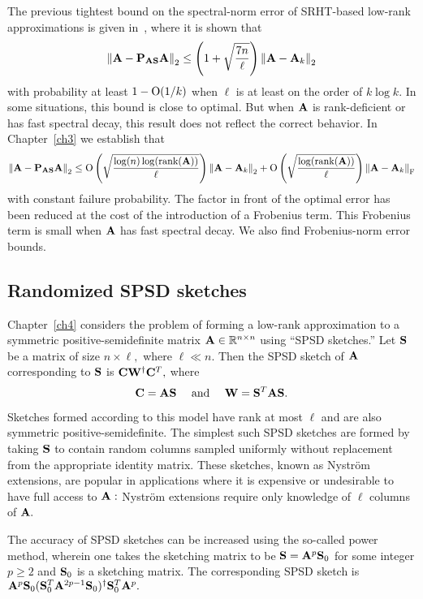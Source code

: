 The previous tightest bound on the spectral-norm error of SRHT-based low-rank
approximations is given in~\cite{HMT11}, where it is shown that 
\[
 \left\|\mathbf{A} - \mathbf{P}_{\mathbf{A}\mathbf{S}}\mathbf{A}\right\|_2 \leq 
 \left(1 + \sqrt{\frac{7n}{\ell}}\right) \left\|\mathbf{A} - \mathbf{A}_k\right\|_2
\]
with probability at least $1 - \mathrm{O}(1/k)$ when $\ell$ is at least on 
the order of $k \log k.$ In some situations, this bound is close to optimal. 
But when $\mathbf{A}$ is rank-deficient or has fast spectral decay, this result 
does not reflect the correct behavior. In Chapter~\ref{ch3} we establish that
\[
 \left\|\mathbf{A} - \mathbf{P}_{\mathbf{A}\mathbf{S}}\mathbf{A}\right\|_2 \leq 
 \mathrm{O}\left(\sqrt{\frac{\log(n)\log(\text{rank}(\mathbf{A}))}{\ell}}\right) 
 \left\|\mathbf{A} - \mathbf{A}_k\right\|_2 + \mathrm{O}\left(\sqrt{\frac{\log(\text{rank}(\mathbf{A}))}{\ell}}\right) 
 \left\|\mathbf{A} - \mathbf{A}_k\right\|_{\mathrm{F}}
\]
with constant failure probability. The factor 
in front of the optimal error has been reduced at the cost of 
the introduction of a Frobenius term. This Frobenius term is small when 
$\mathbf{A}$ has fast spectral decay. We also find Frobenius-norm error bounds.

\subsection{Randomized SPSD sketches}

Chapter~\ref{ch4} considers the problem of forming a low-rank approximation 
to a symmetric positive-semidefinite matrix $\mathbf{A}\in\mathbb{R}^{n\times n}$ using ``SPSD sketches.'' 
Let $\mathbf{S}$ be a matrix of size $n \times \ell,$ where $\ell \ll n.$ Then the
SPSD sketch of $\mathbf{A}$ corresponding to $\mathbf{S}$ is $\mathbf{C} \mathbf{W}^\dagger \mathbf{C}^T,$
where 
\[
 \mathbf{C} = \mathbf{A} \mathbf{S} \quad \text{ and }\quad \mathbf{W} = \mathbf{S}^T \mathbf{A} \mathbf{S}.
\]

Sketches formed according to this model have rank at most $\ell$ and are 
also symmetric positive-semidefinite. The simplest such SPSD sketches 
are formed by taking $\mathbf{S}$ to contain random columns sampled uniformly 
without replacement from the appropriate identity matrix. These sketches, 
known as Nystr\"om extensions, are popular in applications where it is
expensive or undesirable to have full access to $\mathbf{A}:$ Nystr\"om extensions
require only knowledge of $\ell$ columns of $\mathbf{A}.$

The accuracy of SPSD sketches can be increased using the so-called power method,
wherein one takes the sketching matrix to be $\mathbf{S} = \mathbf{A}^p \mathbf{S}_0$ for
some integer $p \geq 2$ and $\mathbf{S}_0$ is a sketching matrix. The corresponding
SPSD sketch is $\mathbf{A}^p \mathbf{S}_0 (\mathbf{S}_0^T \mathbf{A}^{2p -1} \mathbf{S}_0)^\dagger \mathbf{S}_0^T \mathbf{A}^p.$

